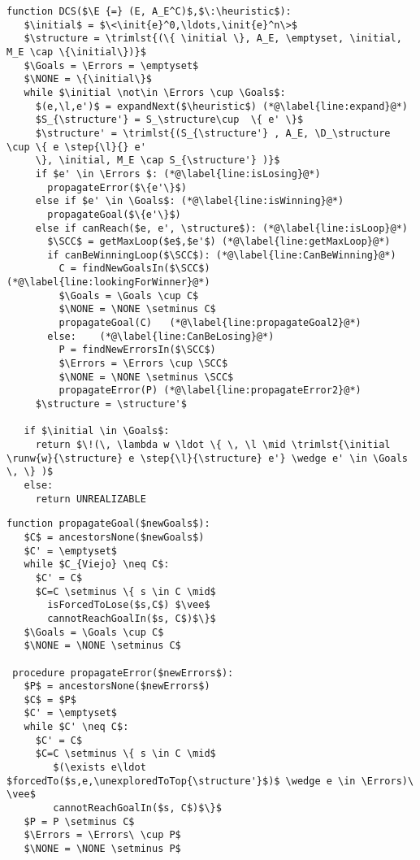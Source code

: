 \lstset{numbers=left, numberstyle=\tiny, stepnumber=1, numbersep=5pt}
\begin{lstlisting}[language={pseudocode},label={lst:dcs},caption={On-the-fly Directed Exploration Procedure.},float=ht, frame=single]
 function DCS($\E {=} (E, A_E^C)$,$\:\heuristic$):
   $\initial$ = $\<\init{e}^0,\ldots,\init{e}^n\>$
   $\structure = \trimlst{(\{ \initial \}, A_E, \emptyset, \initial, M_E \cap \{\initial\})}$
   $\Goals = \Errors = \emptyset$
   $\NONE = \{\initial\}$
   while $\initial \not\in \Errors \cup \Goals$:
     $(e,\l,e')$ = expandNext($\heuristic$) (*@\label{line:expand}@*)
     $S_{\structure'} = S_\structure\cup  \{ e' \}$
     $\structure' = \trimlst{(S_{\structure'} , A_E, \D_\structure \cup \{ e \step{\l}{} e' 
     \}, \initial, M_E \cap S_{\structure'} )}$
     if $e' \in \Errors $: (*@\label{line:isLosing}@*)
       propagateError($\{e'\}$)
     else if $e' \in \Goals$: (*@\label{line:isWinning}@*)
       propagateGoal($\{e'\}$)
     else if canReach($e, e', \structure$): (*@\label{line:isLoop}@*)
       $\SCC$ = getMaxLoop($e$,$e'$) (*@\label{line:getMaxLoop}@*)
       if canBeWinningLoop($\SCC$): (*@\label{line:CanBeWinning}@*)
         C = findNewGoalsIn($\SCC$) (*@\label{line:lookingForWinner}@*)
         $\Goals = \Goals \cup C$
         $\NONE = \NONE \setminus C$
         propagateGoal(C)   (*@\label{line:propagateGoal2}@*)
       else:    (*@\label{line:CanBeLosing}@*)
         P = findNewErrorsIn($\SCC$)
         $\Errors = \Errors \cup \SCC$
         $\NONE = \NONE \setminus \SCC$
         propagateError(P) (*@\label{line:propagateError2}@*)
     $\structure = \structure'$
 
   if $\initial \in \Goals$:
     return $\!(\, \lambda w \ldot \{ \, \l \mid \trimlst{\initial \runw{w}{\structure} e \step{\l}{\structure} e'} \wedge e' \in \Goals \, \} )$
   else:
     return UNREALIZABLE
\end{lstlisting}  

\lstset{numbers=none, numberstyle=\tiny, stepnumber=1, numbersep=5pt}
\begin{lstlisting}[language={pseudocode},label={lst:dcs.propagate},caption={Status propagation procedures.},float=ht, frame=single]
 function propagateGoal($newGoals$):
   $C$ = ancestorsNone($newGoals$)
   $C' = \emptyset$
   while $C_{Viejo} \neq C$:
     $C' = C$
     $C=C \setminus \{ s \in C \mid$ 
       isForcedToLose($s,C$) $\vee$
       cannotReachGoalIn($s, C$)$\}$
   $\Goals = \Goals \cup C$
   $\NONE = \NONE \setminus C$

 procedure propagateError($newErrors$):
   $P$ = ancestorsNone($newErrors$)
   $C$ = $P$
   $C' = \emptyset$
   while $C' \neq C$:
     $C' = C$
     $C=C \setminus \{ s \in C \mid$ 
     	$(\exists e\ldot $forcedTo($s,e,\unexploredToTop{\structure'}$)$ \wedge e \in \Errors)\ \vee$
     	cannotReachGoalIn($s, C$)$\}$
   $P = P \setminus C$
   $\Errors = \Errors\ \cup P$
   $\NONE = \NONE \setminus P$
\end{lstlisting}


